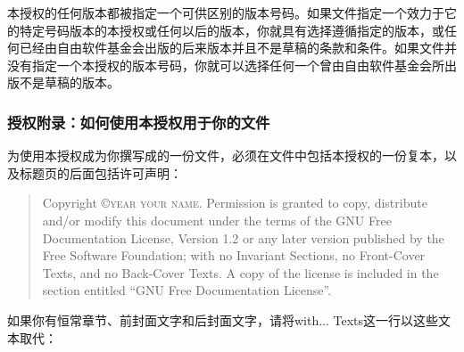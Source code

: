 
本授权的任何版本都被指定一个可供区别的版本号码。如果文件指定一个效力于它的特定号码版本的本授权或任何以后的版本，你就具有选择遵循指定的版本，或任何已经由自由软件基金会出版的后来版本并且不是草稿的条款和条件。如果文件并没有指定一个本授权的版本号码，你就可以选择任何一个曾由自由软件基金会所出版不是草稿的版本。


\subsubsection{授权附录：如何使用本授权用于你的文件}


为使用本授权成为你撰写成的一份文件，必须在文件中包括本授权的一份复本，以及标题页的后面包括许可声明：

\bigskip
\begin{quote}
    Copyright \copyright \textsc{year your name}.
    Permission is granted to copy, distribute and/or modify this document under the terms of the GNU Free Documentation License, Version 1.2 or any later version published by the Free Software Foundation; with no Invariant Sections, no Front-Cover Texts, and no Back-Cover Texts. A copy of the license is included in the section entitled ``GNU Free Documentation License''.
\end{quote}
\bigskip


如果你有恒常章节、前封面文字和后封面文字，请将with... Texts这一行以这些文本取代：

